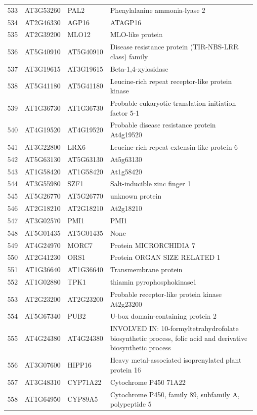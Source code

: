\documentclass[11pt]{article}
\begin{document}
\begin{center}
\begin{tabular}{rlll}
533 & AT3G53260 & PAL2 & Phenylalanine ammonia-lyase 2\\
534 & AT2G46330 & AGP16 & ATAGP16\\
535 & AT2G39200 & MLO12 & MLO-like protein\\
536 & AT5G40910 & AT5G40910 & Disease resistance protein (TIR-NBS-LRR class) family\\
537 & AT3G19615 & AT3G19615 & Beta-1,4-xylosidase\\
538 & AT5G41180 & AT5G41180 & Leucine-rich repeat receptor-like protein kinase\\
539 & AT1G36730 & AT1G36730 & Probable eukaryotic translation initiation factor 5-1\\
540 & AT4G19520 & AT4G19520 & Probable disease resistance protein At4g19520\\
541 & AT3G22800 & LRX6 & Leucine-rich repeat extensin-like protein 6\\
542 & AT5G63130 & AT5G63130 & At5g63130\\
543 & AT1G58420 & AT1G58420 & At1g58420\\
544 & AT3G55980 & SZF1 & Salt-inducible zinc finger 1\\
545 & AT5G26770 & AT5G26770 & unknown protein\\
546 & AT2G18210 & AT2G18210 & At2g18210\\
547 & AT3G02570 & PMI1 & PMI1\\
548 & AT5G01435 & AT5G01435 & None\\
549 & AT4G24970 & MORC7 & Protein MICRORCHIDIA 7\\
550 & AT2G41230 & ORS1 & Protein ORGAN SIZE RELATED 1\\
551 & AT1G36640 & AT1G36640 & Transmembrane protein\\
552 & AT1G02880 & TPK1 & thiamin pyrophosphokinase1\\
553 & AT2G23200 & AT2G23200 & Probable receptor-like protein kinase At2g23200\\
554 & AT5G67340 & PUB2 & U-box domain-containing protein 2\\
555 & AT4G24380 & AT4G24380 & INVOLVED IN: 10-formyltetrahydrofolate biosynthetic process, folic acid and derivative biosynthetic process\\
556 & AT3G07600 & HIPP16 & Heavy metal-associated isoprenylated plant protein 16\\
557 & AT3G48310 & CYP71A22 & Cytochrome P450 71A22\\
558 & AT1G64950 & CYP89A5 & Cytochrome P450, family 89, subfamily A, polypeptide 5\\

\end{tabular}
\end{center}
\end{document}
